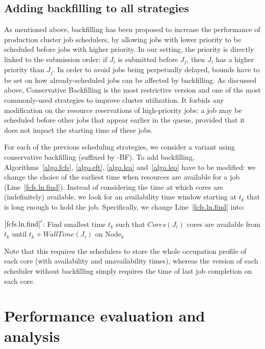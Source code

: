\documentclass[sigconf,review,anonymous]{acmart}
\newcommand{\Node}[1]{\ensuremath{\mathrm{Node}_{#1}}\xspace}
\newcommand{\core}{\mathit{Cores}\xspace}
\newcommand{\walltime}{\mathit{WallTime}\xspace}
\begin{document}
\subsection{Adding backfilling to all strategies}

As mentioned above, backfilling has been proposed to increase the
performance of production cluster job schedulers, by allowing jobs with lower priority to be
scheduled before jobs with higher priority. In our setting, the
priority is directly linked to the submission order: if $J_i$ is
submitted before $J_j$, then $J_i$ has a higher priority than $J_j$.
In order to avoid jobs
being perpetually delayed, bounds have to be set on how already-scheduled
jobs can be affected by backfilling. As discussed above,
Conservative Backfilling is the most restrictive version and one of
the most commonly-used strategies to improve cluster utilization. It
forbids any modification on the resource
reservations of high-priority jobs: a job may be scheduled
before other jobs that appear earlier in the queue, provided that it
does not impact the starting time of these jobs.


For each of the previous scheduling strategies, we consider a variant
using conservative backfilling (suffixed by -BF).  To add
backfilling, Algorithms~\ref{algo.fcfs}, \ref{algo.eft},
\ref{algo.lea} and~\ref{algo.leo} have to be modified: we change the
choice of the earliest time when resources are available for a job
(Line~\ref{fcfs.ln.find}). Instead of considering the time at which
cores are (indefinitely) available, we look for an availability time
window starting at $t_k$ that is long enough to hold the
job. Specifically, we change Line~\ref{fcfs.ln.find} into:
\begin{algorithmic}[0]
  \State $\ref{fcfs.ln.find}'$: Find smallest time $t_k$ such that $\core(J_i)$ cores are
  available from $t_k$ until $t_k + \walltime(J_i)$ on $\Node{k}$
\end{algorithmic}

Note that this requires the schedulers to store  the whole occupation profile of
each core (with availability and unavailability times), whereas the
version of each scheduler without backfilling simply requires the time
of last job completion on each core.

\section{Performance evaluation and analysis}\label{sec.evaluations}
\end{document}

